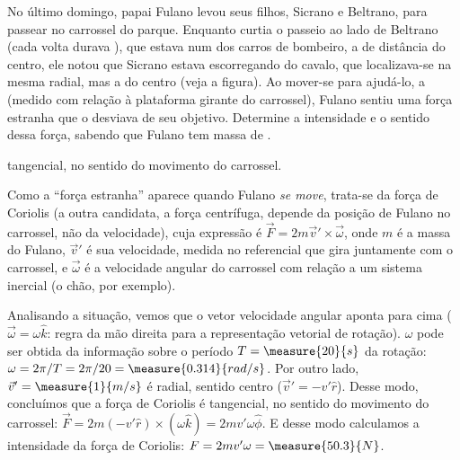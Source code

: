 \begin{question}
	No último domingo, papai Fulano levou seus filhos, Sicrano e Beltrano, para passear no carrossel do parque.
	Enquanto curtia o passeio ao lado de Beltrano (cada volta durava ), que estava num dos carros de bombeiro, a  de distância do centro, ele notou que Sicrano estava escorregando do cavalo, que localizava-se na mesma radial, mas a  do centro (veja a figura).
	Ao mover-se para ajudá-lo, a  (medido com relação à plataforma girante do carrossel), Fulano sentiu uma força estranha que o desviava de seu objetivo.
	Determine a intensidade e o sentido dessa força, sabendo que Fulano tem massa de .

	\begin{answer}
		 tangencial, no sentido do movimento do carrossel.
	\end{answer}


	\begin{solution}
		Como a ``força estranha'' aparece quando Fulano \emph{se move}, trata-se da força de Coriolis (a outra candidata, a força centrífuga, depende da posição de Fulano no carrossel, não da velocidade), cuja expressão é $\vec F = 2m\vec v' \times \vec \omega$, onde $m$ é a massa do Fulano, $\vec v'$ é sua velocidade, medida no referencial que gira juntamente com o carrossel, e $\vec\omega$ é a velocidade angular do carrossel com relação a um sistema inercial (o chão, por exemplo).

		Analisando a situação, vemos que o vetor velocidade angular aponta para cima ($\vec\omega = \omega\hat k$: regra da mão direita para a representação vetorial de rotação). $\omega$ pode ser obtida da informação sobre o período $T = \measure{20}{s}$ da rotação: $\omega = 2\pi/T = 2\pi/20 = \measure{0.314}{rad/s}$. Por outro lado, $\vec v' = \measure{1}{m/s}$ é radial, sentido centro ($\vec v' = -v'\hat r$).
		Desse modo, concluímos que a força de Coriolis é tangencial, no sentido do movimento do carrossel: $\vec F = 2m(-v'\hat r)\times(\omega \hat k) = 2mv'\omega \hat \phi$. E desse modo calculamos a intensidade da força de Coriolis: $F = 2mv'\omega = \measure{50.3}{N}$.
	\end{solution}
\end{question}

\begin{comment}
```python
from math import pi

def question_5i(m, v, t):
	omega = 2 * pi / t
	return [omega, 2 * m * v * omega]
```
\end{comment}